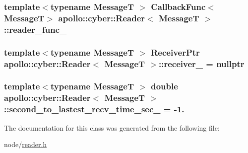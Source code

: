 \hypertarget{classapollo_1_1cyber_1_1Reader_afdcdb17f7d7931c63296cb16d25c57c1}{
\subsubsection[{reader\-\_\-func\-\_\-}]{\setlength{\rightskip}{0pt plus 5cm}template$<$typename Message\-T $>$ {\bf Callback\-Func}$<$Message\-T$>$ {\bf apollo\-::cyber\-::\-Reader}$<$ Message\-T $>$\-::reader\-\_\-func\-\_\-\hspace{0.3cm}{\ttfamily [private]}}}\label{classapollo_1_1cyber_1_1Reader_afdcdb17f7d7931c63296cb16d25c57c1}
\hypertarget{classapollo_1_1cyber_1_1Reader_a5524305568327b0bbe875ef3d1a7ba70}{
\subsubsection[{receiver\-\_\-}]{\setlength{\rightskip}{0pt plus 5cm}template$<$typename Message\-T $>$ {\bf Receiver\-Ptr} {\bf apollo\-::cyber\-::\-Reader}$<$ Message\-T $>$\-::receiver\-\_\- = nullptr\hspace{0.3cm}{\ttfamily [private]}}}\label{classapollo_1_1cyber_1_1Reader_a5524305568327b0bbe875ef3d1a7ba70}
\hypertarget{classapollo_1_1cyber_1_1Reader_ac3a5475b325e2934669803280370c2f3}{
\subsubsection[{second\-\_\-to\-\_\-lastest\-\_\-recv\-\_\-time\-\_\-sec\-\_\-}]{\setlength{\rightskip}{0pt plus 5cm}template$<$typename Message\-T $>$ double {\bf apollo\-::cyber\-::\-Reader}$<$ Message\-T $>$\-::second\-\_\-to\-\_\-lastest\-\_\-recv\-\_\-time\-\_\-sec\-\_\- = -\/1.\hspace{0.3cm}{\ttfamily [protected]}}}\label{classapollo_1_1cyber_1_1Reader_ac3a5475b325e2934669803280370c2f3}


The documentation for this class was generated from the following file\-:\begin{DoxyCompactItemize}
\item 
node/\hyperlink{reader_8h}{reader.\-h}\end{DoxyCompactItemize}
